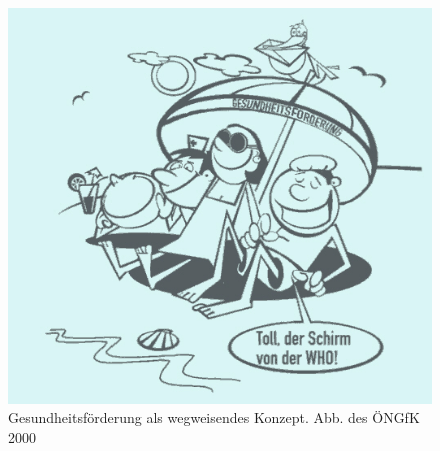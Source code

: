 \begin{figure}
	\vfill
	\centering
		\includegraphics{schirm.jpg}
	\caption{Gesundheitsförderung als wegweisendes Konzept. Abb. des ÖNGfK 2000}
	\label{fig:schirm}
	\vfill
\end{figure}

